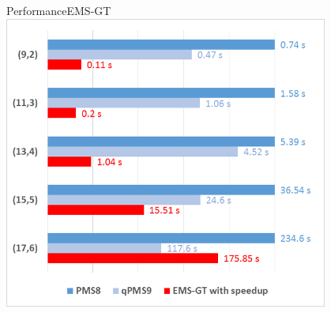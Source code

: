 \documentclass[pdf,xcolor={dvipsnames}]{beamer}
\begin{document}
\begin{frame}{Performance}{EMS-GT}
	\centering
	\includegraphics[width=0.8\textwidth]{img/emsgt-with-speedup-vs-PMS,qPMS9.png}\\
	\end{frame}
\end{document}
